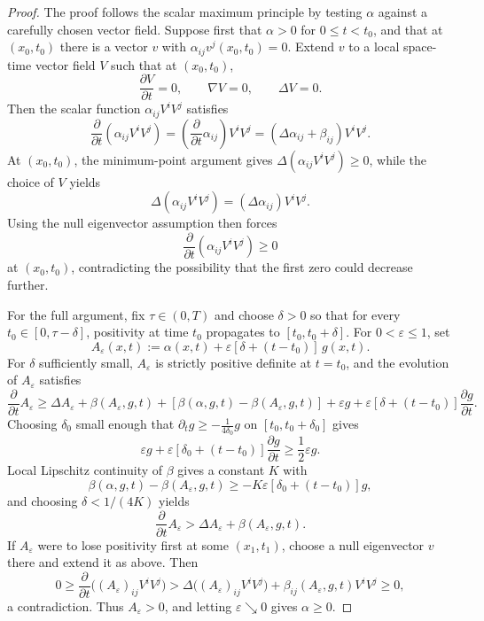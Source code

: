\begin{proof}
The proof follows the scalar maximum principle by testing \(\alpha\) against a carefully chosen vector field. Suppose first that \(\alpha>0\) for \(0\le t<t_0\), and that at \((x_0,t_0)\) there is a vector \(v\) with \(\alpha_{ij}v^j(x_0,t_0)=0\). Extend \(v\) to a local space-time vector field \(V\) such that at \((x_0,t_0)\),
\[
\frac{\partial V}{\partial t}=0,\qquad \nabla V=0,\qquad \Delta V=0.
\]
Then the scalar function \(\alpha_{ij}V^iV^j\) satisfies
\[
\frac{\partial}{\partial t}(\alpha_{ij}V^iV^j)
 = \left(\frac{\partial}{\partial t}\alpha_{ij}\right)V^iV^j
 = (\Delta\alpha_{ij}+\beta_{ij})V^iV^j.
\]
At \((x_0,t_0)\), the minimum-point argument gives \(\Delta(\alpha_{ij}V^iV^j)\ge 0\), while the choice of \(V\) yields
\[
\Delta(\alpha_{ij}V^iV^j)=(\Delta\alpha_{ij})V^iV^j.
\]
Using the null eigenvector assumption then forces
\[
\frac{\partial}{\partial t}(\alpha_{ij}V^iV^j)\ge 0
\]
at \((x_0,t_0)\), contradicting the possibility that the first zero could decrease further.

For the full argument, fix \(\tau \in (0,T)\) and choose \(\delta>0\) so that for every \(t_0\in[0,\tau-\delta]\), positivity at time \(t_0\) propagates to \([t_0,t_0+\delta]\). For \(0<\varepsilon\le 1\), set
\[
A_\varepsilon(x,t):=\alpha(x,t)+\varepsilon[\delta+(t-t_0)]\,g(x,t).
\]
For \(\delta\) sufficiently small, \(A_\varepsilon\) is strictly positive definite at \(t=t_0\), and the evolution of \(A_\varepsilon\) satisfies
\[
\frac{\partial}{\partial t}A_\varepsilon
\ge \Delta A_\varepsilon+\beta(A_\varepsilon,g,t)+[\beta(\alpha,g,t)-\beta(A_\varepsilon,g,t)]+\varepsilon g+\varepsilon[\delta+(t-t_0)]\frac{\partial g}{\partial t}.
\]
Choosing \(\delta_0\) small enough that \(\partial_t g\ge -\frac1{4\delta_0}g\) on \([t_0,t_0+\delta_0]\) gives
\[
\varepsilon g+\varepsilon[\delta_0+(t-t_0)]\frac{\partial g}{\partial t}\ge \frac12 \varepsilon g.
\]
Local Lipschitz continuity of \(\beta\) gives a constant \(K\) with
\[
\beta(\alpha,g,t)-\beta(A_\varepsilon,g,t)\ge -K\varepsilon[\delta_0+(t-t_0)]g,
\]
and choosing \(\delta<1/(4K)\) yields
\[
\frac{\partial}{\partial t}A_\varepsilon>\Delta A_\varepsilon+\beta(A_\varepsilon,g,t).
\]
If \(A_\varepsilon\) were to lose positivity first at some \((x_1,t_1)\), choose a null eigenvector \(v\) there and extend it as above. Then
\[
0\ge \frac{\partial}{\partial t}\bigl((A_\varepsilon)_{ij}V^iV^j\bigr)
> \Delta\bigl((A_\varepsilon)_{ij}V^iV^j\bigr)+\beta_{ij}(A_\varepsilon,g,t)V^iV^j\ge 0,
\]
a contradiction. Thus \(A_\varepsilon>0\), and letting \(\varepsilon\searrow 0\) gives \(\alpha\ge 0\).
\end{proof}

